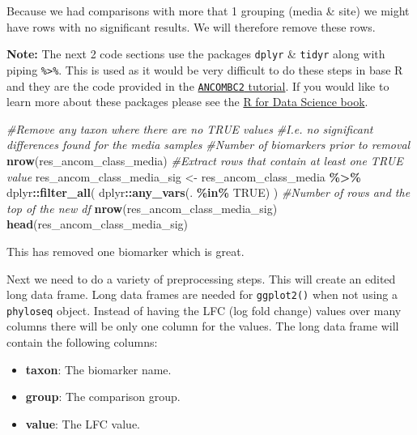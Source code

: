 \documentclass[
]{book}
\newenvironment{Shaded}{\begin{snugshade}}{\end{snugshade}}
\newcommand{\CommentTok}[1]{\textcolor[rgb]{0.56,0.35,0.01}{\textit{#1}}}
\newcommand{\ConstantTok}[1]{\textcolor[rgb]{0.56,0.35,0.01}{#1}}
\newcommand{\FunctionTok}[1]{\textcolor[rgb]{0.13,0.29,0.53}{\textbf{#1}}}
\newcommand{\NormalTok}[1]{#1}
\newcommand{\OtherTok}[1]{\textcolor[rgb]{0.56,0.35,0.01}{#1}}
\newcommand{\SpecialCharTok}[1]{\textcolor[rgb]{0.81,0.36,0.00}{\textbf{#1}}}
\providecommand{\tightlist}{%
  \setlength{\itemsep}{0pt}\setlength{\parskip}{0pt}}
\begin{document}
Because we had comparisons with more that 1 grouping (media \& site) we might have rows with no significant results.
We will therefore remove these rows.

\textbf{Note:} The next 2 code sections use the packages \texttt{dplyr} \& \texttt{tidyr} along with piping \texttt{\%\textgreater{}\%}.
This is used as it would be very difficult to do these steps in base R and they are the code provided in the \href{https://bioconductor.org/packages/release/bioc/vignettes/ANCOMBC/inst/doc/ANCOMBC2.html}{\texttt{ANCOMBC2} tutorial}.
If you would like to learn more about these packages please see the \href{https://r4ds.had.co.nz/}{R for Data Science book}.

\begin{Shaded}
\begin{Highlighting}[]
\CommentTok{\#Remove any taxon where there are no TRUE values}
\CommentTok{\#I.e. no significant differences found for the media samples}
\CommentTok{\#Number of biomarkers prior to removal}
\FunctionTok{nrow}\NormalTok{(res\_ancom\_class\_media)}
\CommentTok{\#Extract rows that contain at least one TRUE value}
\NormalTok{res\_ancom\_class\_media\_sig }\OtherTok{\textless{}{-}}\NormalTok{ res\_ancom\_class\_media }\SpecialCharTok{\%\textgreater{}\%}\NormalTok{ dplyr}\SpecialCharTok{::}\FunctionTok{filter\_all}\NormalTok{(}
\NormalTok{  dplyr}\SpecialCharTok{::}\FunctionTok{any\_vars}\NormalTok{(. }\SpecialCharTok{\%in\%} \ConstantTok{TRUE}\NormalTok{)}
\NormalTok{)}
\CommentTok{\#Number of rows and the top of the new df}
\FunctionTok{nrow}\NormalTok{(res\_ancom\_class\_media\_sig)}
\FunctionTok{head}\NormalTok{(res\_ancom\_class\_media\_sig)}
\end{Highlighting}
\end{Shaded}

This has removed one biomarker which is great.

Next we need to do a variety of preprocessing steps.
This will create an edited long data frame.
Long data frames are needed for \texttt{ggplot2()} when not using a \texttt{phyloseq} object.
Instead of having the LFC (log fold change) values over many columns there will be only one column for the values.
The long data frame will contain the following columns:

\begin{itemize}
\tightlist
\item
  \textbf{taxon}: The biomarker name.
\item
  \textbf{group}: The comparison group.
\item
  \textbf{value}: The LFC value.
\end{itemize}
\end{document}
